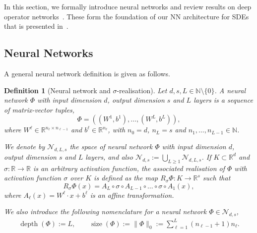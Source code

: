 \documentclass[12pt]{article}
\newtheorem{definition}[theorem]{Definition}
\theoremstyle{remark}
\theoremstyle{plain}
\numberwithin{equation}{section}
\newcommand{\N}{\mathbb{N}}
\newcommand{\R}{\mathbb{R}}
\DeclareMathOperator{\Size}{size}
\DeclareMathOperator{\Depth}{depth}
\begin{document}
In this section, we formally introduce neural networks and review results on deep operator networks~\cite{lanthalerErrorEstimatesDeepONets2022}.
These form the foundation of our NN architecture for SDEs that is presented in~.

\subsection{Neural Networks}
\label{sec:NN}

A general neural network definition is given as follows.
\begin{definition}[Neural network and $\sigma$-realisation]\label{def:nn}
    Let $d,s,L \in \N\setminus \{0\}$. A \emph{neural network} $\Phi$ with input dimension $d$, output dimension $s$ and $L$ layers is a sequence of matrix-vector tuples,
    \begin{equation*}
        \Phi = ((W^1, b^1),\dots,(W^L,b^L)),
    \end{equation*}
    where $W^\ell \in \R^{n_\ell \times n_{\ell-1}}$ and $b^\ell \in \R^{n_\ell}$, with $n_0=d$, $n_L=s$ and $n_1,\dots,n_{L-1}\in\N$.
    
    We denote by $\mathcal N_{d,L,s}$ the space of neural network $\Phi$ with input dimension $d$, output dimension $s$ and $L$ layers, and also $\mathcal N_{d,s} := \bigcup_{L \geq 1}\mathcal N_{d,L,s}$. If $K \subset \R^d$ and $\sigma : \R \to \R$ is an arbitrary activation function, the associated realisation of $\Phi$ with activation function $\sigma$ over $K$ is defined as the map $ R_\sigma \Phi : K \to \R^s$ such that
    \begin{equation*}
        R_\sigma \Phi(x) = A_L \circ \sigma \circ A_{L-1} \circ \dots \circ \sigma \circ A_1 (x),
    \end{equation*}
    where $A_\ell(x) = W^\ell \cdot x + b^\ell$ is an affine transformation.

    We also introduce the following nomenclature for a neural network $\Phi \in \mathcal N_{d,s}$,
    \begin{align*}
        \Depth(\Phi) := L,\qquad
        \Size(\Phi) := \|\Phi\|_0
        := \sum_{\ell=1}^L (n_{\ell-1} + 1)n_\ell.
    \end{align*}
\end{definition}
\end{document}
